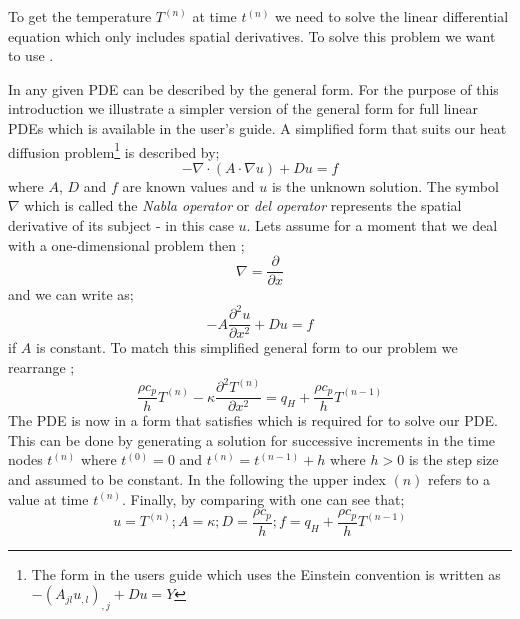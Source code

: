 To get the temperature $T^{(n)}$ at time $t^{(n)}$ we need to solve the linear 
differential equation  which only includes spatial
derivatives. To solve this problem we want to use \esc. 

In \esc any given PDE can be described by the general form. For the purpose of
this introduction we illustrate a simpler version of the general form for full
linear PDEs which is available in the \esc user's guide. A simplified form that
suits our heat diffusion problem\footnote{The form in the \esc users guide which
uses the Einstein convention is written as 
$-(A_{jl} u_{,l})_{,j}+D u =Y$}
is described by;
\begin{equation}\label{eqn:commonform nabla}
-\nabla\cdot(A\cdot\nabla u) + Du = f
\end{equation}
where $A$, $D$ and $f$ are known values and $u$ is the unknown solution. The
symbol $\nabla$ which is called the \textit{Nabla operator} or \textit{del
operator} represents
the spatial derivative of its subject - in this case $u$. Lets assume for a
moment that we deal with a one-dimensional problem then ;
\begin{equation}
\nabla = \frac{\partial}{\partial x}
\end{equation}
and we can write  as;
\begin{equation}\label{eqn:commonform}
-A\frac{\partial^{2}u}{\partial x^{2}} + Du = f
\end{equation}
if $A$ is constant. To match this simplified general form to our problem
we rearrange ;
\begin{equation}
\frac{\rho c_p}{h} T^{(n)} - \kappa \frac{\partial^2 T^{(n)}}{\partial
x^2} = q_H +  \frac{\rho c_p}{h} T^{(n-1)}
\label{eqn:hdgenf}
\end{equation}
The PDE is now in a form that satisfies  which is
required for \esc to solve our PDE. This can be done by generating a solution
for successive increments in the time nodes $t^{(n)}$ where 
$t^{(0)}=0$ and  $t^{(n)}=t^{(n-1)}+h$ where $h>0$ is the step size and assumed
to be constant. 
In the following the upper index ${(n)}$ refers to a value at time $t^{(n)}$.
Finally, by comparing  with  one can see
that;
\begin{equation}\label{ESCRIPT SET}
u=T^{(n)}; 
A = \kappa; D = \frac{\rho c _{p}}{h}; f = q _{H} + \frac{\rho
c_p}{h} T^{(n-1)}
\end{equation}

